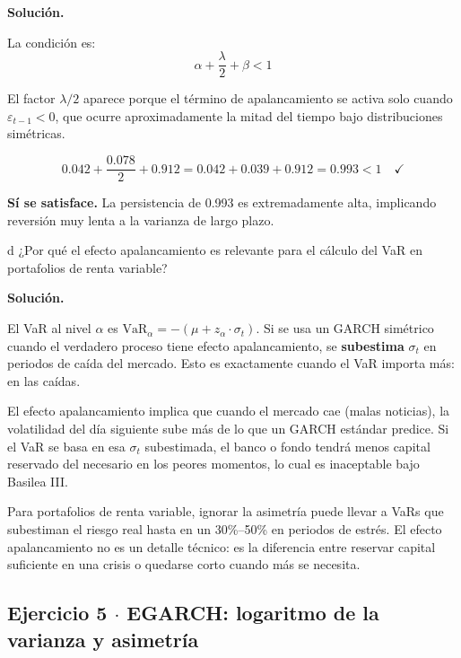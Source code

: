 \documentclass[11pt,a4paper]{article}
\newcommand{\eps}{\varepsilon}
\begin{document}
\textbf{Solución.}

La condición es:
\[
\alpha + \frac{\lambda}{2} + \beta < 1
\]

El factor $\lambda/2$ aparece porque el término de apalancamiento se activa solo cuando $\eps_{t-1}<0$, que ocurre aproximadamente la mitad del tiempo bajo distribuciones simétricas.

\[
0.042 + \frac{0.078}{2} + 0.912 = 0.042 + 0.039 + 0.912 = 0.993 < 1 \quad \checkmark
\]

\textbf{Sí se satisface.} La persistencia de 0.993 es extremadamente alta, implicando reversión muy lenta a la varianza de largo plazo.

\begin{cajaInciso}{d}
¿Por qué el efecto apalancamiento es relevante para el cálculo del VaR en portafolios de renta variable?
\end{cajaInciso}

\textbf{Solución.}

El VaR al nivel $\alpha$ es $\text{VaR}_\alpha = -(\mu + z_\alpha\cdot\sigma_t)$. Si se usa un GARCH simétrico cuando el verdadero proceso tiene efecto apalancamiento, se \textbf{subestima} $\sigma_t$ en periodos de caída del mercado. Esto es exactamente cuando el VaR importa más: en las caídas.

El efecto apalancamiento implica que cuando el mercado cae (malas noticias), la volatilidad del día siguiente sube más de lo que un GARCH estándar predice. Si el VaR se basa en esa $\sigma_t$ subestimada, el banco o fondo tendrá menos capital reservado del necesario en los peores momentos, lo cual es inaceptable bajo Basilea III.

\begin{cajaHallazgo}
Para portafolios de renta variable, ignorar la asimetría puede llevar a VaRs que subestiman el riesgo real hasta en un 30\%--50\% en periodos de estrés. El efecto apalancamiento no es un detalle técnico: es la diferencia entre reservar capital suficiente en una crisis o quedarse corto cuando más se necesita.
\end{cajaHallazgo}

\subsection*{Ejercicio 5 \texorpdfstring{$\cdot$}{·} EGARCH: logaritmo de la varianza y asimetría}
\end{document}
